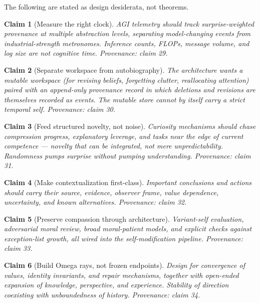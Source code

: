 \documentclass[11pt]{article}
\newtheorem{claim}{Claim}
\begin{document}
The following are stated as design desiderata, not theorems.

\begin{claim}[Measure the right clock]
AGI telemetry should track surprise-weighted provenance at multiple abstraction levels, separating model-changing events from industrial-strength metronomes. Inference counts, FLOPs, message volume, and log size are not cognitive time.
\emph{Provenance: claim 29.}
\end{claim}

\begin{claim}[Separate workspace from autobiography]
The architecture wants a mutable workspace (for revising beliefs, forgetting clutter, reallocating attention) paired with an append-only provenance record in which deletions and revisions are themselves recorded as events. The mutable store cannot by itself carry a strict temporal self.
\emph{Provenance: claim 30.}
\end{claim}

\begin{claim}[Feed structured novelty, not noise]
Curiosity mechanisms should chase compression progress, explanatory leverage, and tasks near the edge of current competence --- novelty that can be integrated, not mere unpredictability. Randomness pumps surprise without pumping understanding.
\emph{Provenance: claim 31.}
\end{claim}

\begin{claim}[Make contextualization first-class]
Important conclusions and actions should carry their source, evidence, observer frame, value dependence, uncertainty, and known alternatives.
\emph{Provenance: claim 32.}
\end{claim}

\begin{claim}[Preserve compassion through architecture]
Variant-self evaluation, adversarial moral review, broad moral-patient models, and explicit checks against exception-list growth, all wired into the self-modification pipeline.
\emph{Provenance: claim 33.}
\end{claim}

\begin{claim}[Build Omega rays, not frozen endpoints]
Design for convergence of values, identity invariants, and repair mechanisms, together with open-ended expansion of knowledge, perspective, and experience. Stability of direction coexisting with unboundedness of history.
\emph{Provenance: claim 34.}
\end{claim}
\end{document}
